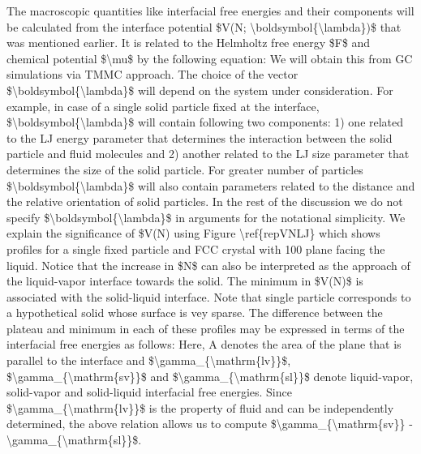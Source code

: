\par The macroscopic quantities like interfacial free energies and their components will be calculated from the interface potential \$V(N; \textbackslash boldsymbol\{\textbackslash lambda\})\$ that was mentioned earlier. It is related to the Helmholtz free energy \$F\$ and chemical potential \$\textbackslash mu\$ by the following equation: We will obtain this from GC simulations via TMMC approach. The choice of the vector \$\textbackslash boldsymbol\{\textbackslash lambda\}\$ will depend on the system under consideration. For example, in case of a single solid particle fixed at the interface, \$\textbackslash boldsymbol\{\textbackslash lambda\}\$ will contain following two components: 1) one related to the LJ energy parameter that determines the interaction between the solid particle and fluid molecules and 2) another related to the LJ size parameter that determines the size of the solid particle. For greater number of particles \$\textbackslash boldsymbol\{\textbackslash lambda\}\$ will also contain parameters related to the distance and the relative orientation of solid particles. In the rest of the discussion we do not specify \$\textbackslash boldsymbol\{\textbackslash lambda\}\$ in arguments for the notational simplicity. We explain the significance of \$V(N) using Figure \textbackslash ref\{repVNLJ\} which shows profiles for a single fixed particle and FCC crystal with 100 plane facing the liquid. Notice that the increase in \$N\$ can also be interpreted as the approach of the liquid-vapor interface towards the solid. The minimum in \$V(N)\$ is associated with the solid-liquid interface. Note that single particle corresponds to a hypothetical solid whose surface is vey sparse. The difference between the plateau and minimum in each of these profiles may be expressed in terms of the interfacial free energies as follows: Here, A denotes the area of the plane that is parallel to the interface and \$\textbackslash gamma\_\{\textbackslash mathrm\{lv\}\}\$, \$\textbackslash gamma\_\{\textbackslash mathrm\{sv\}\}\$ and \$\textbackslash gamma\_\{\textbackslash mathrm\{sl\}\}\$ denote liquid-vapor, solid-vapor and solid-liquid interfacial free energies. Since \$\textbackslash gamma\_\{\textbackslash mathrm\{lv\}\}\$ is the property of fluid and can be independently determined, the above relation allows us to compute \$\textbackslash gamma\_\{\textbackslash mathrm\{sv\}\} - \textbackslash gamma\_\{\textbackslash mathrm\{sl\}\}\$.
